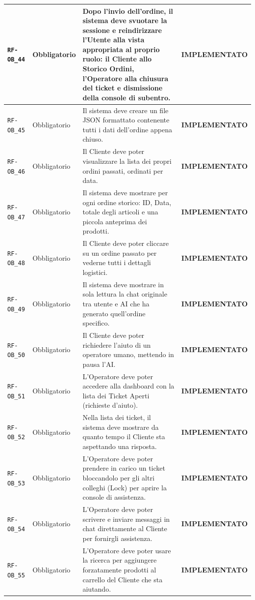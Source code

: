 \documentclass[a4paper, 11pt, oneside]{scrartcl}
\begin{document}
\begin{longtable}{|>{\raggedright\arraybackslash}p{}|>{\raggedright\arraybackslash}p{}|>{\raggedright\arraybackslash}p{}|>{\raggedright\arraybackslash}p{}|}
    \texttt{RF-OB\_44} & Obbligatorio & Dopo l'invio dell'ordine, il sistema deve svuotare la sessione e reindirizzare l'Utente alla vista appropriata al proprio ruolo: il Cliente allo Storico Ordini, l'Operatore alla chiusura del ticket e dismissione della console di subentro. & \textbf{IMPLEMENTATO} \\
    \hline
    \texttt{RF-OB\_45} & Obbligatorio & Il sistema deve creare un file JSON formattato contenente tutti i dati dell'ordine appena chiuso. & \textbf{IMPLEMENTATO} \\
    \hline
    \texttt{RF-OB\_46} & Obbligatorio & Il Cliente deve poter visualizzare la lista dei propri ordini passati, ordinati per data. & \textbf{IMPLEMENTATO} \\
    \hline
    \texttt{RF-OB\_47} & Obbligatorio & Il sistema deve mostrare per ogni ordine storico: ID, Data, totale degli articoli e una piccola anteprima dei prodotti. & \textbf{IMPLEMENTATO} \\
    \hline
    \texttt{RF-OB\_48} & Obbligatorio & Il Cliente deve poter cliccare su un ordine passato per vederne tutti i dettagli logistici. & \textbf{IMPLEMENTATO} \\
    \hline
    \texttt{RF-OB\_49} & Obbligatorio & Il sistema deve mostrare in sola lettura la chat originale tra utente e AI che ha generato quell'ordine specifico. & \textbf{IMPLEMENTATO} \\
    \hline
    \texttt{RF-OB\_50} & Obbligatorio & Il Cliente deve poter richiedere l'aiuto di un operatore umano, mettendo in pausa l'AI. & \textbf{IMPLEMENTATO} \\
    \hline
    \texttt{RF-OB\_51} & Obbligatorio & L'Operatore deve poter accedere alla dashboard con la lista dei Ticket Aperti (richieste d'aiuto). & \textbf{IMPLEMENTATO} \\
    \hline
    \texttt{RF-OB\_52} & Obbligatorio & Nella lista dei ticket, il sistema deve mostrare da quanto tempo il Cliente sta aspettando una risposta. & \textbf{IMPLEMENTATO} \\
    \hline
    \texttt{RF-OB\_53} & Obbligatorio & L'Operatore deve poter prendere in carico un ticket bloccandolo per gli altri colleghi (Lock) per aprire la console di assistenza. & \textbf{IMPLEMENTATO} \\
    \hline
    \texttt{RF-OB\_54} & Obbligatorio & L'Operatore deve poter scrivere e inviare messaggi in chat direttamente al Cliente per fornirgli assistenza. & \textbf{IMPLEMENTATO} \\
    \hline
    \texttt{RF-OB\_55} & Obbligatorio & L'Operatore deve poter usare la ricerca per aggiungere forzatamente prodotti al carrello del Cliente che sta aiutando. & \textbf{IMPLEMENTATO} \\

\end{longtable}
\end{document}
